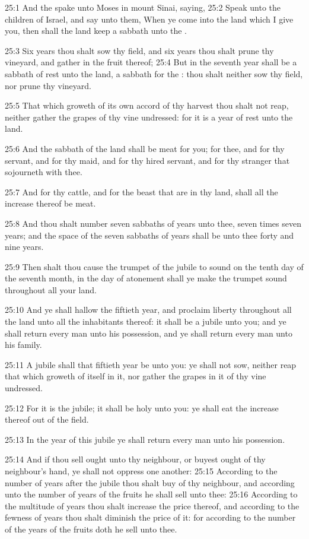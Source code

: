 25:1 And the \LORD spake unto Moses in mount Sinai, saying, 25:2 Speak unto the children of Israel, and say unto them, When ye come into the land which I give you, then shall the land keep a sabbath unto the \LORD.

25:3 Six years thou shalt sow thy field, and six years thou shalt prune thy vineyard, and gather in the fruit thereof; 25:4 But in the seventh year shall be a sabbath of rest unto the land, a sabbath for the \LORD: thou shalt neither sow thy field, nor prune thy vineyard.

25:5 That which groweth of its own accord of thy harvest thou shalt not reap, neither gather the grapes of thy vine undressed: for it is a year of rest unto the land.

25:6 And the sabbath of the land shall be meat for you; for thee, and for thy servant, and for thy maid, and for thy hired servant, and for thy stranger that sojourneth with thee.

25:7 And for thy cattle, and for the beast that are in thy land, shall all the increase thereof be meat.

25:8 And thou shalt number seven sabbaths of years unto thee, seven times seven years; and the space of the seven sabbaths of years shall be unto thee forty and nine years.

25:9 Then shalt thou cause the trumpet of the jubile to sound on the tenth day of the seventh month, in the day of atonement shall ye make the trumpet sound throughout all your land.

25:10 And ye shall hallow the fiftieth year, and proclaim liberty throughout all the land unto all the inhabitants thereof: it shall be a jubile unto you; and ye shall return every man unto his possession, and ye shall return every man unto his family.

25:11 A jubile shall that fiftieth year be unto you: ye shall not sow, neither reap that which groweth of itself in it, nor gather the grapes in it of thy vine undressed.

25:12 For it is the jubile; it shall be holy unto you: ye shall eat the increase thereof out of the field.

25:13 In the year of this jubile ye shall return every man unto his possession.

25:14 And if thou sell ought unto thy neighbour, or buyest ought of thy neighbour's hand, ye shall not oppress one another: 25:15 According to the number of years after the jubile thou shalt buy of thy neighbour, and according unto the number of years of the fruits he shall sell unto thee: 25:16 According to the multitude of years thou shalt increase the price thereof, and according to the fewness of years thou shalt diminish the price of it: for according to the number of the years of the fruits doth he sell unto thee.

